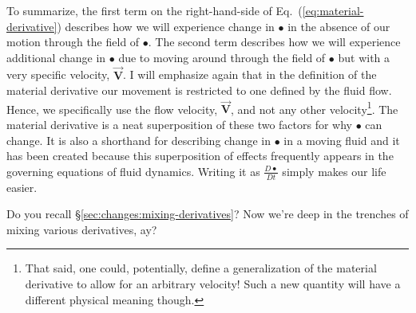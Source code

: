 To summarize, the first term on the right-hand-side of Eq.~(\ref{eq:material-derivative}) describes how we will experience change in $\bullet$ in the absence of our motion through the field of $\bullet$. The second term describes how we will experience additional change in $\bullet$ due to moving around through the field of $\bullet$ but with a very specific velocity, $\vec{\bm{V}}$. I will emphasize again that in the definition of the material derivative our movement is restricted to one defined by the fluid flow. Hence, we specifically use the flow velocity, $\vec{\bm{V}}$, and not any other velocity\footnote{That said, one could, potentially, define a generalization of the material derivative to allow for an arbitrary velocity! Such a new quantity will have a different physical meaning though.}. The material derivative is a neat superposition of these two factors for why $\bullet$ can change. It is also a shorthand for describing change in $\bullet$ in a moving fluid and it has been created because this superposition of effects frequently appears in the governing equations of fluid dynamics. Writing it as $\frac{D \bullet}{D t}$ simply makes our life easier.

Do you recall \S\ref{sec:changes:mixing-derivatives}? Now we're deep in the trenches of mixing various derivatives, ay?

